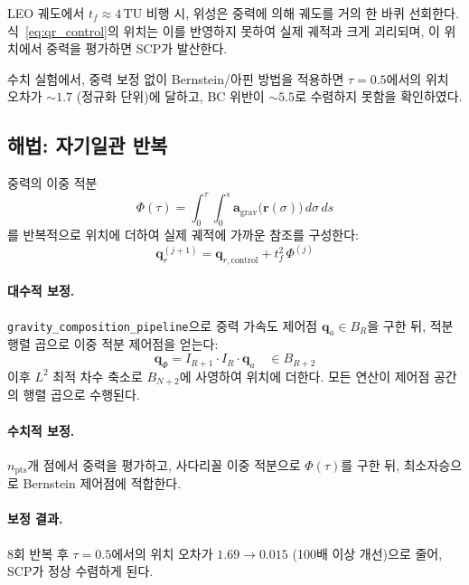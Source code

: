 \documentclass[11pt]{article}
\begin{document}
LEO 궤도에서 $t_f \approx 4\,\text{TU}$ 비행 시, 위성은 중력에 의해
궤도를 거의 한 바퀴 선회한다.
식~\eqref{eq:qr_control}의 위치는 이를 반영하지 못하여
실제 궤적과 크게 괴리되며, 이 위치에서 중력을 평가하면
SCP가 발산한다.

수치 실험에서, 중력 보정 없이 Bernstein/아핀 방법을 적용하면
$\tau = 0.5$에서의 위치 오차가 $\sim1.7$ (정규화 단위)에 달하고,
BC 위반이 $\sim5.5$로 수렴하지 못함을 확인하였다.

\subsection{해법: 자기일관 반복}

중력의 이중 적분
\begin{equation}
  \Phi(\tau) = \int_0^\tau\!\int_0^s
    \mathbf{a}_{\mathrm{grav}}\!\bigl(\mathbf{r}(\sigma)\bigr)\,d\sigma\,ds
  \label{eq:phi}
\end{equation}
를 반복적으로 위치에 더하여 실제 궤적에 가까운 참조를 구성한다:
\begin{equation}
  \mathbf{q}_r^{(j+1)} = \mathbf{q}_{r,\mathrm{control}}
    + t_f^2 \, \Phi^{(j)}
  \label{eq:selfconsistent}
\end{equation}

\paragraph{대수적 보정.}
\texttt{gravity\_composition\_pipeline}으로 중력 가속도 제어점
$\mathbf{q}_a \in B_R$을 구한 뒤, 적분 행렬 곱으로 이중 적분 제어점을 얻는다:
\begin{equation}
  \mathbf{q}_\Phi = I_{R+1} \cdot I_R \cdot \mathbf{q}_a
  \quad \in B_{R+2}
  \label{eq:phi_algebraic}
\end{equation}
이후 $L^2$ 최적 차수 축소로 $B_{N+2}$에 사영하여 위치에 더한다.
모든 연산이 제어점 공간의 행렬 곱으로 수행된다.

\paragraph{수치적 보정.}
$n_{\mathrm{pts}}$개 점에서 중력을 평가하고, 사다리꼴 이중 적분으로
$\Phi(\tau)$를 구한 뒤, 최소자승으로 Bernstein 제어점에 적합한다.

\paragraph{보정 결과.}
8회 반복 후 $\tau = 0.5$에서의 위치 오차가 $1.69 \to 0.015$
(100배 이상 개선)으로 줄어, SCP가 정상 수렴하게 된다.
\end{document}
